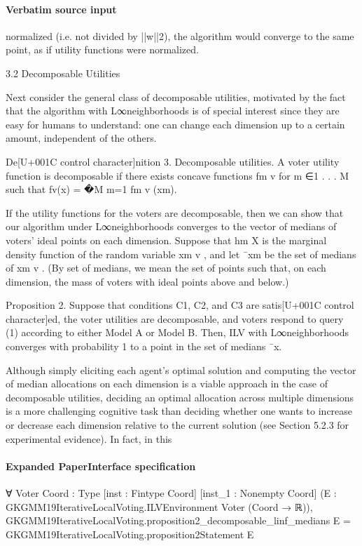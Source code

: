 \documentclass[10pt]{article}
\begin{document}
\paragraph{Verbatim source input}
\begin{ReviewVerbatim}
normalized (i.e. not divided by ||w||2), the algorithm would converge to the same point, as
if utility functions were normalized.

3.2 Decomposable Utilities

Next consider the general class of decomposable utilities, motivated by the fact that the
algorithm with L∞neighborhoods is of special interest since they are easy for humans to
understand: one can change each dimension up to a certain amount, independent of the
others.

De[U+001C control character]nition 3. Decomposable utilities. A voter utility function is decomposable if there
exists concave functions fm
v
for m ∈{1 . . . M} such that fv(x) = �M
m=1 fm
v (xm).

If the utility functions for the voters are decomposable, then we can show that our
algorithm under L∞neighborhoods converges to the vector of medians of voters' ideal points
on each dimension. Suppose that hm
X is the marginal density function of the random variable
xm
v , and let ¯xm be the set of medians of xm
v . (By set of medians, we mean the set of points
such that, on each dimension, the mass of voters with ideal points above and below.)

Proposition 2. Suppose that conditions C1, C2, and C3 are satis[U+001C control character]ed, the voter utilities
are decomposable, and voters respond to query (1) according to either Model A or Model
B. Then, ILV with L∞neighborhoods converges with probability 1 to a point in the set of
medians ¯x.

Although simply eliciting each agent's optimal solution and computing the vector of
median allocations on each dimension is a viable approach in the case of decomposable
utilities, deciding an optimal allocation across multiple dimensions is a more challenging
cognitive task than deciding whether one wants to increase or decrease each dimension
relative to the current solution (see Section 5.2.3 for experimental evidence). In fact, in this
\end{ReviewVerbatim}


\paragraph{Expanded PaperInterface specification}
\begin{ReviewVerbatim}
∀ {Voter Coord : Type} [inst : Fintype Coord] [inst_1 : Nonempty Coord]
  (E : GKGMM19IterativeLocalVoting.ILVEnvironment Voter (Coord → ℝ)),
  GKGMM19IterativeLocalVoting.proposition2_decomposable_linf_medians E =
    GKGMM19IterativeLocalVoting.proposition2Statement E
\end{ReviewVerbatim}
\end{document}
